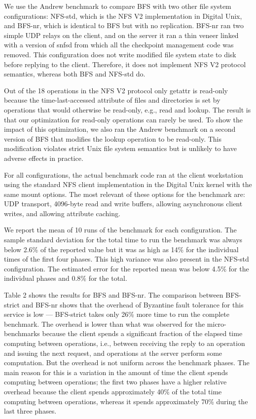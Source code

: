 \documentclass[
]{article}
\begin{document}
We use the Andrew benchmark to compare BFS with two other file system
configurations: NFS-std, which is the NFS V2 implementation in Digital
Unix, and BFS-nr, which is identical to BFS but with no replication.
BFS-nr ran two simple UDP relays on the client, and on the server it ran
a thin veneer linked with a version of snfsd from which all the
checkpoint management code was removed. This configuration does not
write modified file system state to disk before replying to the client.
Therefore, it does not implement NFS V2 protocol semantics, whereas both
BFS and NFS-std do.

Out of the 18 operations in the NFS V2 protocol only getattr is
read-only because the time-last-accessed attribute of files and
directories is set by operations that would otherwise be read-only,
e.g., read and lookup. The result is that our optimization for read-only
operations can rarely be used. To show the impact of this optimization,
we also ran the Andrew benchmark on a second version of BFS that
modifies the lookup operation to be read-only. This modification
violates strict Unix file system semantics but is unlikely to have
adverse effects in practice.

For all configurations, the actual benchmark code ran at the client
workstation using the standard NFS client implementation in the Digital
Unix kernel with the same mount options. The most relevant of these
options for the benchmark are: UDP transport, 4096-byte read and write
buffers, allowing asynchronous client writes, and allowing attribute
caching.

We report the mean of 10 runs of the benchmark for each configuration.
The sample standard deviation for the total time to run the benchmark
was always below 2.6\% of the reported value but it was as high as 14\%
for the individual times of the first four phases. This high variance
was also present in the NFS-std configuration. The estimated error for
the reported mean was below 4.5\% for the individual phases and 0.8\%
for the total.

Table 2 shows the results for BFS and BFS-nr. The comparison between
BFS-strict and BFS-nr shows that the overhead of Byzantine fault
tolerance for this service is low --- BFS-strict takes only 26\% more
time to run the complete benchmark. The overhead is lower than what was
observed for the micro-benchmarks because the client spends a
significant fraction of the elapsed time computing between operations,
i.e., between receiving the reply to an operation and issuing the next
request, and operations at the server perform some computation. But the
overhead is not uniform across the benchmark phases. The main reason for
this is a variation in the amount of time the client spends computing
between operations; the first two phases have a higher relative overhead
because the client spends approximately 40\% of the total time computing
between operations, whereas it spends approximately 70\% during the last
three phases.
\end{document}
